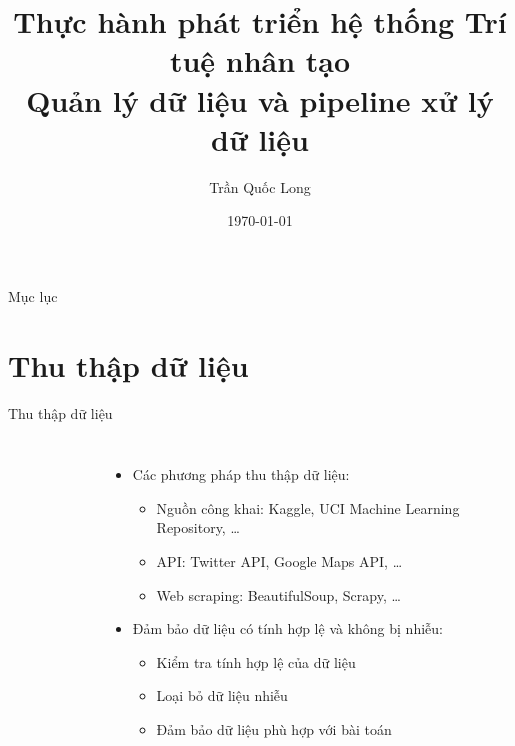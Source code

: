 \documentclass{beamer}
\title{Thực hành phát triển hệ thống Trí tuệ nhân tạo\\
Quản lý dữ liệu và pipeline xử lý dữ liệu
}
\author{Trần Quốc Long}
\institute{Trường ĐH Công nghệ, ĐHQG Hà Nội}
\date{\today}
\begin{document}
\begin{frame}
    \titlepage
\end{frame}

\begin{frame}{Mục lục}
    \tableofcontents
\end{frame}

\section{Thu thập dữ liệu}

\begin{frame}{Thu thập dữ liệu}
    \begin{columns}
        \begin{figure}
            \centering
        \end{figure}
        \begin{itemize}
            \item Các phương pháp thu thập dữ liệu:
            \begin{itemize}
                \item Nguồn công khai: Kaggle, UCI Machine Learning Repository, \dots
                \item API: Twitter API, Google Maps API, \dots
                \item Web scraping: BeautifulSoup, Scrapy, \dots
            \end{itemize}
            \item Đảm bảo dữ liệu có tính hợp lệ và không bị nhiễu:
            \begin{itemize}
                \item Kiểm tra tính hợp lệ của dữ liệu
                \item Loại bỏ dữ liệu nhiễu
                \item Đảm bảo dữ liệu phù hợp với bài toán
            \end{itemize}
        \end{itemize}
    \end{columns}
\end{frame}
\end{document}
